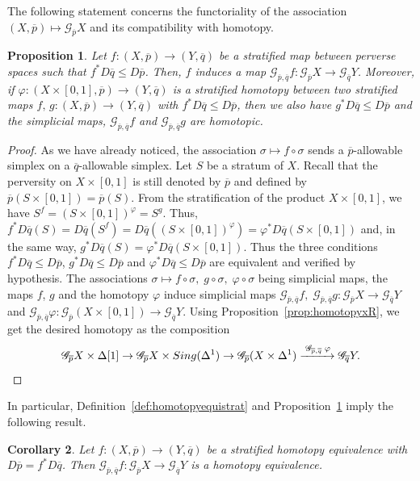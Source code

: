 \documentclass[a4paper,10pt,english,reqno]{amsart}
\theoremstyle{plain}
\newtheorem{proposition}{Proposition}[section]
\newtheorem{corollary}[proposition]{Corollary}
\theoremstyle{definition}
\theoremstyle{remark}
\numberwithin{equation}{section}
\newcommand{\propref}[1]{Proposition~\ref{#1}}
\newcommand{\defref}[1]{Definition~\ref{#1}}
\def\ov{\overline}
\def\crG{{\mathscr G}}
\def\sing{{\rm Sing}}
\renewcommand\1{\hbox{\ding{192}}}
\renewcommand\2{\hbox{\ding{193}}}
\newcommand\3{\hbox{\ding{194}}}
\newcommand\4{\hbox{\ding{195}}}
\begin{document}
The following statement concerns the functoriality of the association
$(X,\ov{p})\mapsto \crG_{\ov{p}}X$
and its compatibility with homotopy.

\begin{proposition}\label{prop:gajermap}
Let $f \colon (X,\ov{p}) \to (Y,\ov{q})$ be a stratified map between perverse spaces such that
$f^*D\ov{q}\leq D\ov{p}$. 
Then, 
$f$ induces a map $\crG_{\ov{p},\ov{q}}f\colon \crG_{\ov{p}}X\to \crG_{\ov{q}}Y$.
%
Moreover, if  $\varphi\colon (X\times [0,1],\ov{p})\to (Y,\ov{q})$ is a  stratified homotopy between two stratified maps
$f,\,g\colon (X,\ov{p})\to (Y,\ov{q})$ with $f^*D\ov{q}\leq D\ov{p}$, then we also have $g^*D\ov{q}\leq D\ov{p}$
and the simplicial maps, $\crG_{\ov{p},\ov{q}}f$ and $\crG_{\ov{p},\ov{q}}g$ are homotopic.
\end{proposition}


\begin{proof}
%
%
As we have already noticed, the association
$\sigma\mapsto f\circ \sigma$ 
sends a $\ov{p}$-allowable simplex on a $\ov{q}$-allowable simplex.
Let $S$ be a stratum of $X$. Recall that the perversity on $X\times [0,1]$ is still denoted by $\ov{p}$ and defined by $\ov{p}(S\times [0,1])=\ov{p}(S)$.
From the stratification of the product $X\times [0,1]$, we have
$S^f=(S\times [0,1])^{\varphi}=S^g$. 
Thus, 
$f^*D\ov{q}(S)=D\ov{q}(S^f)=D\ov{q}((S\times [0,1])^{\varphi})=\varphi^*D\ov{q}(S\times [0,1])$
and, in the same way,
$g^*D\ov{q}(S)=\varphi^*D\ov{q}(S\times [0,1])$.
Thus the three conditions $f^*D\ov{q}\leq D\ov{p}$, $g^*D\ov{q}\leq D\ov{p}$ and $\varphi^*D\ov{q}\leq D\ov{p}$ are equivalent and verified by hypothesis.
%
The associations
$\sigma\mapsto f\circ \sigma, \;g\circ \sigma, \;\varphi\circ\sigma$
being simplicial maps, 
the maps $f$, $g$ and the homotopy $\varphi$ induce simplicial maps 
$\crG_{\ov{p},\ov{q}}f,\;\crG_{\ov{p},\ov{q}}g\colon\crG_{\ov{p}}X\to \crG_{\ov{q}}Y$
and
$\crG_{\ov{p},\ov{q}}\varphi\colon \crG_{\ov{p}}(X\times [0,1])\to \crG_{\ov{q}}Y$.
Using  \propref{prop:homotopyxR}, we get the desired homotopy as the composition
$$
\crG_{\ov{p}}X\times \Delta[1]\to \crG_{\ov{p}}X\times \sing(\Delta^1)\to
\crG_{\ov{p}}(X\times \Delta^1)
\xrightarrow{\;\crG_{\ov{p},\ov{q}\;}\varphi}
\crG_{\ov{q}}Y.
$$
\end{proof}

In particular, \defref{def:homotopyequistrat} and \propref{prop:gajermap} imply the following result.

\begin{corollary}\label{cor:gajerhomotopy}
Let $f\colon (X,\ov{p})\to (Y,\ov{q})$ be a stratified homotopy equivalence with $D\ov{p}=f^*D\ov{q}$.
Then $\crG_{\ov{p},\ov{q}}f\colon \crG_{\ov{p}}X\to \crG_{\ov{q}}Y$ is a homotopy equivalence.
%
\end{corollary}
\end{document}
